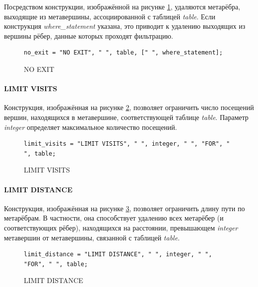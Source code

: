 Посредством конструкции, изображённой на рисунке \ref{symbol-no-exit}, удаляются метарёбра, выходящие из метавершины, ассоциированной с таблицей \textit{table}. Если конструкция \textit{where\_statement} указана, это приводит к удалению выходящих из вершины рёбер, данные которых проходят фильтрацию.

\begin{figure}
  \begin{lstlisting}
no_exit = "NO EXIT", " ", table, [" ", where_statement];
  \end{lstlisting}
  \caption{NO EXIT}
  \label{symbol-no-exit}
\end{figure}

\paragraph{LIMIT VISITS}

Конструкция, изображённая на рисунке \ref{symbol-limit-visits}, позволяет ограничить число посещений вершин, находящихся в метавершине, соответствующей таблице \textit{table}. Параметр \textit{integer} определяет максимальное количество посещений.

\begin{figure}
  \begin{lstlisting}
limit_visits = "LIMIT VISITS", " ", integer, " ", "FOR", " ", table;
  \end{lstlisting}
  \caption{LIMIT VISITS}
  \label{symbol-limit-visits}
\end{figure}

\paragraph{LIMIT DISTANCE}

Конструкция, изображённая на рисунке \ref{symbol-limit-distance}, позволяет ограничить длину пути по метарёбрам. В частности, она способствует удалению всех метарёбер (и соответствующих рёбер), находящихся на расстоянии, превышающем \textit{integer} метавершин от метавершины, связанной с таблицей \textit{table}.

\begin{figure}
  \begin{lstlisting}
limit_distance = "LIMIT DISTANCE", " ", integer, " ", "FOR", " ", table;
  \end{lstlisting}
  \caption{LIMIT DISTANCE}
  \label{symbol-limit-distance}
\end{figure}


